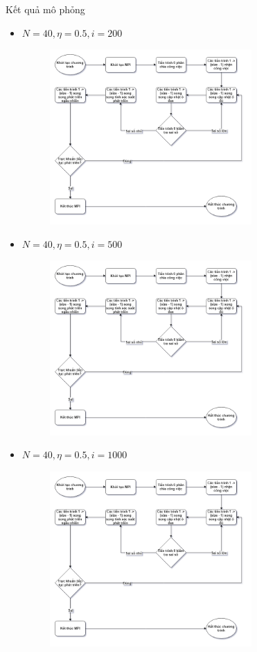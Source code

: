 \begin{frame}[allowframebreaks]{Kết quả mô phỏng}
\begin{itemize}
\begin{figure}[H]
    \end{figure}
\end{itemize}
\break
\begin{itemize}
    \item $N = 40, \eta = 0.5, i = 200$
    \begin{figure}[H]
        \centering
        \includegraphics[width=77mm]{img/algo-flowchart.png}
    \end{figure}
\end{itemize}
\break
\begin{itemize}
    \item $N = 40, \eta = 0.5, i = 500$
    \begin{figure}[H]
        \centering
        \includegraphics[width=77mm]{img/algo-flowchart.png}
    \end{figure}
\end{itemize}
\break
\begin{itemize}
    \item $N = 40, \eta = 0.5, i = 1000$
    \begin{figure}[H]
        \centering
        \includegraphics[width=77mm]{img/algo-flowchart.png}
    \end{figure}
\end{itemize}
\end{frame}